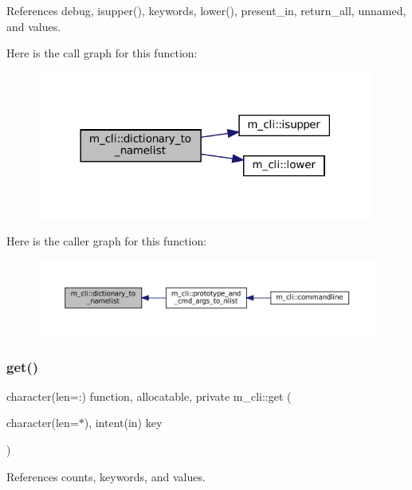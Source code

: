 References debug, isupper(), keywords, lower(), present\+\_\+in, return\+\_\+all, unnamed, and values.

Here is the call graph for this function\+:\nopagebreak
\begin{figure}[H]
\begin{center}
\leavevmode
\includegraphics[width=314pt]{namespacem__cli_a7e5041efcad56387232475a3ae728634_cgraph}
\end{center}
\end{figure}
Here is the caller graph for this function\+:\nopagebreak
\begin{figure}[H]
\begin{center}
\leavevmode
\includegraphics[width=350pt]{namespacem__cli_a7e5041efcad56387232475a3ae728634_icgraph}
\end{center}
\end{figure}
\mbox{\label{namespacem__cli_a45783c194a1484042f63c58b180ca8df}} 
\subsubsection{\texorpdfstring{get()}{get()}}
{\footnotesize\ttfamily character(len=\+:) function, allocatable, private m\+\_\+cli\+::get (\begin{DoxyParamCaption}\item[{character(len=$\ast$), intent(in)}]{key }\end{DoxyParamCaption})\hspace{0.3cm}{\ttfamily [private]}}



References counts, keywords, and values.

